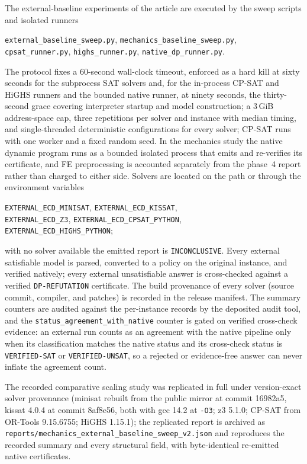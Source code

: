 The external-baseline experiments of the article are executed by the sweep
scripts and isolated runners
\begin{center}
\footnotesize
\texttt{external\_baseline\_sweep.py}, \texttt{mechanics\_baseline\_sweep.py},\\
\texttt{cpsat\_runner.py}, \texttt{highs\_runner.py},
\texttt{native\_dp\_runner.py}.
\end{center}
\noindent The protocol fixes a 60-second wall-clock timeout, enforced as a
hard kill at sixty seconds for the subprocess SAT solvers and, for the
in-process CP-SAT and HiGHS runners and the bounded native runner, at ninety
seconds, the thirty-second grace covering interpreter startup and model
construction; a 3\,GiB
address-space cap, three repetitions per solver and instance with median
timing, and single-threaded deterministic configurations for every solver;
CP-SAT runs with one worker and a fixed random seed. In the mechanics study
the native dynamic program runs as a bounded isolated process that emits and
re-verifies its certificate, and FE preprocessing is accounted separately
from the phase~4 report rather than charged to either side. Solvers are located on the path or through the
environment variables
\begin{center}
\footnotesize
\texttt{EXTERNAL\_ECD\_MINISAT}, \texttt{EXTERNAL\_ECD\_KISSAT},\\
\texttt{EXTERNAL\_ECD\_Z3}, \texttt{EXTERNAL\_ECD\_CPSAT\_PYTHON},\\
\texttt{EXTERNAL\_ECD\_HIGHS\_PYTHON};
\end{center}
with no solver available the emitted report is \texttt{INCONCLUSIVE}. Every
external satisfiable model is parsed, converted to a policy on the original
instance, and verified natively; every external unsatisfiable answer is
cross-checked against a verified \texttt{DP-REFUTATION} certificate. The build
provenance of every solver (source commit, compiler, and patches) is recorded
in the release manifest. The summary counters are audited against the
per-instance records by the deposited audit tool, and the
\texttt{status\_agreement\_with\_native} counter is gated on verified
cross-check evidence: an external run counts as an agreement with the native
pipeline only when its classification matches the native status and its
cross-check status is \texttt{VERIFIED-SAT} or \texttt{VERIFIED-UNSAT}, so a
rejected or evidence-free answer can never inflate the agreement count.

The recorded comparative scaling study was replicated in full under
version-exact solver provenance (minisat rebuilt from the public mirror at
commit 16982a5, kissat 4.0.4 at commit 8af8e56, both with gcc 14.2 at
\texttt{-O3}; z3 5.1.0; CP-SAT from OR-Tools 9.15.6755; HiGHS 1.15.1); the
replicated report is archived as
\texttt{reports/mechanics\_external\_baseline\_sweep\_v2.json} and reproduces
the recorded summary and every structural field, with byte-identical
re-emitted native certificates.

